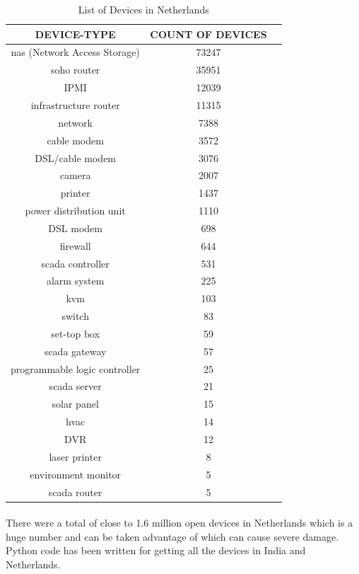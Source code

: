 \documentclass{report}
\begin{document}
\begin{table}[h!]
\begin{center}
\begin{tabular}{ |c|c|c| } 
 \hline
 \textbf{DEVICE-TYPE} & \textbf{COUNT OF DEVICES}\\
 \hline
 nas (Network Access Storage) & 73247  \\
  \hline
 soho router & 35951  \\
  \hline
 IPMI & 12039  \\
  \hline
 infrastructure router & 11315  \\
  \hline
 network & 7388  \\
  \hline
 cable modem & 3572  \\
  \hline
 DSL/cable modem & 3076  \\
  \hline
 camera	 & 2007  \\
  \hline
 printer & 1437  \\
  \hline
 power distribution unit & 1110  \\
  \hline
 DSL modem & 698  \\
 \hline
 firewall & 644  \\
 \hline
 scada controller & 531  \\
 \hline
 alarm system & 225  \\
 \hline
 kvm & 103  \\
 \hline
 switch & 83  \\
 \hline
 set-top box & 59  \\
 \hline
 scada gateway & 57  \\
 \hline
 programmable logic controller	 & 25  \\
 \hline
 scada server & 21  \\
 \hline
 solar panel & 15  \\
 \hline
 hvac & 14  \\
 \hline
 DVR & 12  \\
 \hline
 laser printer & 8  \\
 \hline
 environment monitor & 5  \\
 \hline
 scada router & 5  \\
 \hline
\end{tabular}
\caption{List of Devices in Netherlands}
\end{center}
\end{table}

\paragraph{}
There were a total of close to 1.6 million open devices in Netherlands which is a huge number and can be taken advantage of which can cause severe damage. Python code has been written for getting all the devices in India and Netherlands. 
\end{document}
